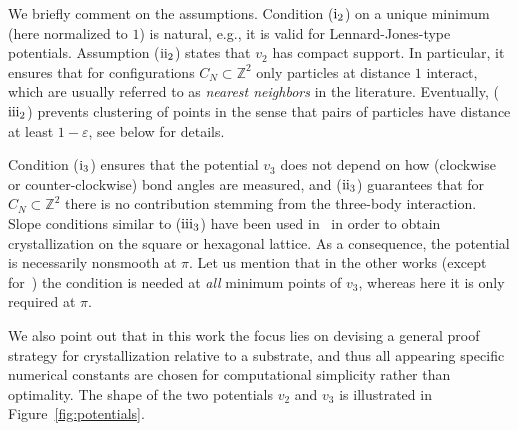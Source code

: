 \documentclass[reqno]{amsart}
\newcommand{\eps}{\varepsilon}
\theoremstyle{plain}
\theoremstyle{definition}
\numberwithin{equation}{section}
\begin{document}
We briefly comment on the assumptions. Condition ($\rm i_2$) on a
unique minimum (here normalized to $1$)   is natural, e.g., it is
valid for Lennard-Jones-type potentials.  Assumption ($\rm ii_2$)
states that $v_2$ has compact support. In particular, it ensures that
for configurations $ C_N  \subset \mathbb{Z}^2$ only  particles  at distance $1$ interact, which are  usually  referred to as \emph{nearest neighbors} in the literature. Eventually, ($\rm iii_2$) prevents clustering of points  in the sense that pairs of  particles  have distance at least $1-\eps$, see     below for details. 

  Condition ($\rm i_3$) ensures that the potential $v_3$ does not depend on how (clockwise or counter-clockwise) bond angles are measured, and ($\rm ii_3$) guarantees  that for $ C_N \subset \mathbb{Z}^2$ there is no contribution stemming from the three-body interaction. Slope conditions similar to   ($\rm iii_3$) have been used in~\cite{FriedrichKreutzHexagonal,FriedrichKreutzSquare,FriedrichKreutz, Mainini-Piovano, Mainini} in order to obtain crystallization on the square or hexagonal lattice. As a consequence,  the potential is necessarily nonsmooth  at $\pi$.  Let us mention that in the  other works (except for~\cite{FriedrichKreutz}) the condition is needed at  \emph{all} minimum points of $v_3$, whereas here it is only required at $\pi$.  
  
  We also point out that in this work the focus lies on devising a general proof strategy for crystallization relative to a substrate,  and thus all appearing  specific numerical constants   are chosen for computational simplicity rather than optimality.  The shape of the two potentials $v_2$ and $v_3$ is illustrated in Figure~\ref{fig:potentials}.  
\end{document}

